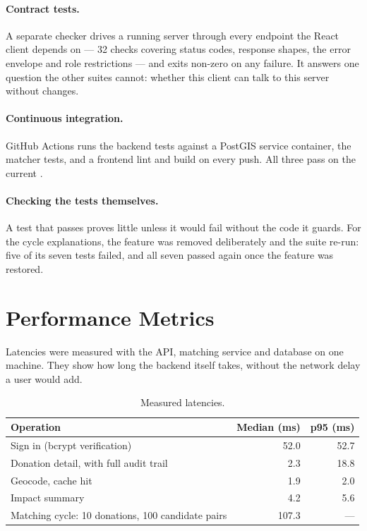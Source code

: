 \documentclass[11pt,a4paper]{report}
\newcommand{\code}[1]{\texttt{\detokenize{#1}}}
\begin{document}
\paragraph{Contract tests.} A separate checker drives a running server through
every endpoint the React client depends on --- 32 checks covering status codes,
response shapes, the error envelope and role restrictions --- and exits non-zero
on any failure. It answers one question the other suites cannot: whether this
client can talk to this server without changes.

\paragraph{Continuous integration.} GitHub Actions runs the backend tests against
a PostGIS service container, the matcher tests, and a frontend lint and build on
every push. All three pass on the current \code{main}.

\paragraph{Checking the tests themselves.} A test that passes proves little unless
it would fail without the code it guards. For the cycle explanations, the
feature was removed deliberately and the suite re-run: five of its seven tests
failed, and all seven passed again once the feature was restored.

\section{Performance Metrics}

Latencies were measured with the API, matching service and database on one
machine. They show how long the backend itself takes, without the network delay
a user would add.

\begin{table}[H]
\centering
\small
\begin{tabular}{@{}lrr@{}}
\toprule
\textbf{Operation} & \textbf{Median (ms)} & \textbf{p95 (ms)} \\
\midrule
Sign in (bcrypt verification) & 52.0 & 52.7 \\
Donation detail, with full audit trail & 2.3 & 18.8 \\
Geocode, cache hit & 1.9 & 2.0 \\
Impact summary & 4.2 & 5.6 \\
Matching cycle: 10 donations, 100 candidate pairs & 107.3 & --- \\
\bottomrule
\end{tabular}
\caption{Measured latencies.}
\end{table}
\end{document}
